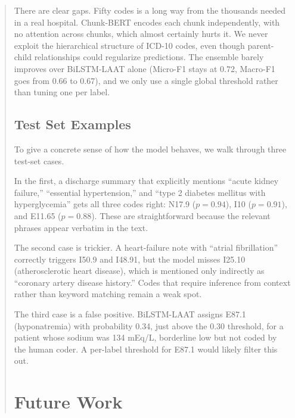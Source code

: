 \documentclass[11pt,a4paper]{article}
\begin{document}
\begin{abstract}
There are clear gaps. Fifty codes is a long way from the thousands needed in a real hospital. Chunk-BERT encodes each chunk independently, with no attention across chunks, which almost certainly hurts it. We never exploit the hierarchical structure of ICD-10 codes, even though parent-child relationships could regularize predictions. The ensemble barely improves over BiLSTM-LAAT alone (Micro-F1 stays at 0.72, Macro-F1 goes from 0.66 to 0.67), and we only use a single global threshold rather than tuning one per label.

\subsection{Test Set Examples}

To give a concrete sense of how the model behaves, we walk through three test-set cases.

In the first, a discharge summary that explicitly mentions ``acute kidney failure,'' ``essential hypertension,'' and ``type 2 diabetes mellitus with hyperglycemia'' gets all three codes right: N17.9 ($p = 0.94$), I10 ($p = 0.91$), and E11.65 ($p = 0.88$). These are straightforward because the relevant phrases appear verbatim in the text.

The second case is trickier. A heart-failure note with ``atrial fibrillation'' correctly triggers I50.9 and I48.91, but the model misses I25.10 (atherosclerotic heart disease), which is mentioned only indirectly as ``coronary artery disease history.'' Codes that require inference from context rather than keyword matching remain a weak spot.

The third case is a false positive. BiLSTM-LAAT assigns E87.1 (hyponatremia) with probability 0.34, just above the 0.30 threshold, for a patient whose sodium was 134 mEq/L, borderline low but not coded by the human coder. A per-label threshold for E87.1 would likely filter this out.

\section{Future Work}


\end{abstract}
\end{document}
